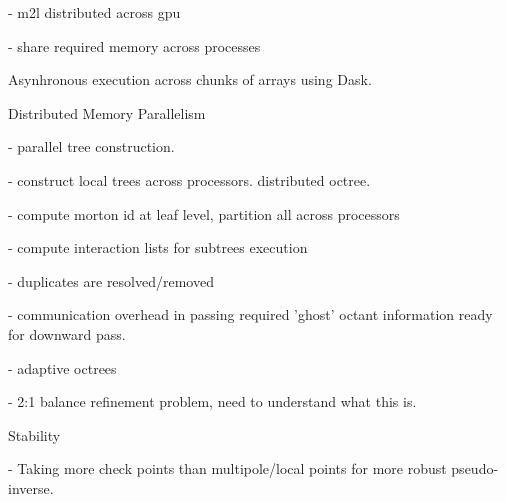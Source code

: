 - m2l distributed across gpu

- share required memory across processes

Asynhronous execution across chunks of arrays using Dask.

Distributed Memory Parallelism

- parallel tree construction.

- construct local trees across processors. distributed octree.

- compute morton id at leaf level, partition all across processors

- compute interaction lists for subtrees execution

- duplicates are resolved/removed

- communication overhead in passing required 'ghost' octant information
ready for downward pass.


- adaptive octrees

    - 2:1 balance refinement problem, need to understand what this is.

Stability

- Taking more check points than multipole/local points for more robust pseudo-inverse.

